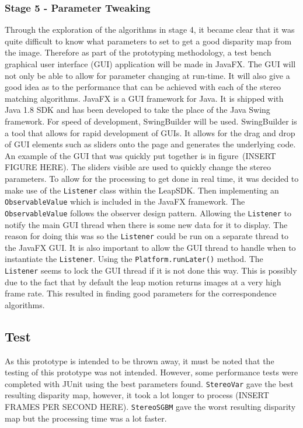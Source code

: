 \documentclass[11pt,oneside]{report}
\newcommand\code[1]{\texttt{#1}}
\begin{document}
		\subsubsection{Stage 5 - Parameter Tweaking}
		Through the exploration of the algorithms in stage 4, it became clear that it was quite difficult to know what parameters to set to get a good disparity map from the image.
		Therefore as part of the prototyping methodology, a test bench graphical user interface (GUI) application will be made in JavaFX.
		The GUI will not only be able to allow for parameter changing at run-time.
		It will also give a good idea as to the performance that can be achieved with each of the stereo matching algorithms.
		JavaFX is a GUI framework for Java.
		It is shipped with Java 1.8 SDK and has been developed to take the place of the Java Swing framework.
		For speed of development, SwingBuilder will be used.
		SwingBuilder is a tool that allows for rapid development of GUIs.
		It allows for the drag and drop of GUI elements such as sliders onto the page and generates the underlying code.
		An example of the GUI that was quickly put together is in figure~(INSERT FIGURE HERE).
		The sliders visible are used to quickly change the stereo parameters.
		To allow for the processing to get done in real time, it was decided to make use of the \code{Listener} class within the LeapSDK.
		Then implementing an \code{ObservableValue} which is included in the JavaFX framework.
		The \code{ObservableValue} follows the observer design pattern.
		Allowing the \code{Listener} to notify the main GUI thread when there is some new data for it to display.
		The reason for doing this was so the \code{Listener} could be run on a separate thread to the JavaFX GUI.
		It is also important to allow the GUI thread to handle when to instantiate the \code{Listener}.
		Using the \code{Platform.runLater()} method.
		The \code{Listener} seems to lock the GUI thread if it is not done this way.
		This is possibly due to the fact that by default the leap motion returns images at a very high frame rate.
		This resulted in finding good parameters for the correspondence algorithms.
		\subsection{Test}
		As this prototype is intended to be thrown away, it must be noted that the testing of this prototype was not intended.
		However, some performance tests were completed with JUnit using the best parameters found.
		\code{StereoVar} gave the best resulting disparity map, however, it took a lot longer to process (INSERT FRAMES PER SECOND HERE).
		\code{StereoSGBM} gave the worst resulting disparity map but the processing time was a lot faster.
\end{document}
